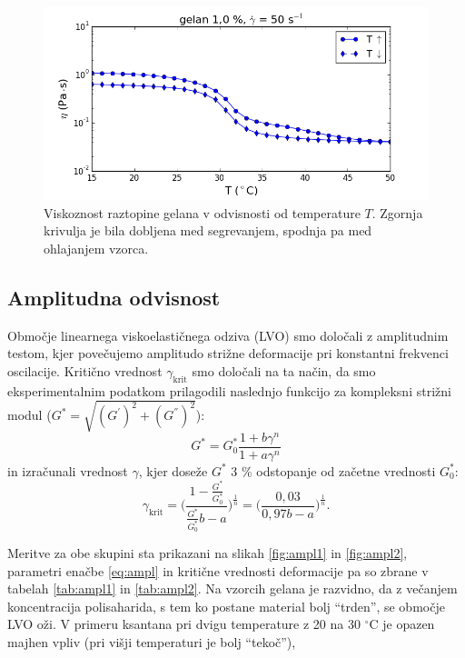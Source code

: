 \documentclass{article}
\begin{document}
\begin{figure}[H]
  \centering
  \includegraphics[width=0.8\linewidth]{temperature.png}
  \caption{Viskoznost raztopine gelana v odvisnosti od temperature $T$. Zgornja krivulja je bila dobljena med segrevanjem, spodnja pa med ohlajanjem vzorca.}
  \label{fig:temp}
\end{figure}


\subsection{Amplitudna odvisnost}

Območje linearnega viskoelastičnega odziva (LVO) smo določali z amplitudnim testom, kjer povečujemo amplitudo strižne deformacije pri konstantni frekvenci oscilacije. Kritično vrednost $\gamma_\mathrm{krit}$ smo določali na ta način, da smo eksperimentalnim podatkom prilagodili naslednjo funkcijo za kompleksni strižni modul ($G^* = \sqrt{(G^{'})^2 + (G^{''})^2}$):
\begin{equation} \label{eq:ampl}
G^* = G^*_0\frac{1+b\gamma^n}{1+a\gamma^n}
\end{equation}
in izračunali vrednost $\gamma$, kjer doseže $G^*$ 3 \% odstopanje od začetne vrednosti $G^*_0$:
\begin{equation}
\gamma_\mathrm{krit}=\Bigg( \frac{1-\frac{G^*}{G^*_0}}{\frac{G^*}{G^*_0}b-a} \Bigg)^{\frac{1}{n}} = \Bigg( \frac{0,03}{0,97b-a} \Bigg)^{\frac{1}{n}} .
\end{equation}

Meritve za obe skupini sta prikazani na slikah \ref{fig:ampl1} in \ref{fig:ampl2}, parametri enačbe \ref{eq:ampl} in kritične vrednosti deformacije pa so zbrane v tabelah \ref{tab:ampl1} in \ref{tab:ampl2}. Na vzorcih gelana je razvidno, da z večanjem koncentracija polisaharida, s tem ko postane material bolj ``trden'', se območje LVO oži. V primeru ksantana pri dvigu temperature z 20 na 30 $^\circ$C je opazen majhen vpliv (pri višji temperaturi je bolj ``tekoč''),
\end{document}
